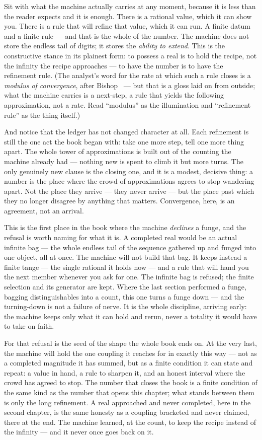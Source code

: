 Sit with what the machine actually carries at any moment, because it is less than the reader expects and it is
enough. There is a rational value, which it can show you. There is a rule that will refine that value, which it can
run. A finite datum and a finite rule --- and that is the whole of the number. The machine does not store the endless
tail of digits; it stores the \emph{ability to extend}. This is the constructive stance in its plainest form: to
possess a real is to hold the recipe, not the infinity the recipe approaches --- to have the number is to have the
refinement rule. (The analyst's word for the rate at which such a rule closes is a \emph{modulus of convergence},
after Bishop~\cite{bishop2006} --- but that is a gloss laid on from outside; what the machine carries is a next-step, a
rule that yields the following approximation, not a rate. Read ``modulus'' as the illumination and ``refinement rule''
as the thing itself.)

And notice that the ledger has not changed character at all. Each refinement is still the one act the book began with:
take one more step, tell one more thing apart. The whole tower of approximations is built out of the counting the
machine already had --- nothing new is spent to climb it but more turns. The only genuinely new clause is the closing
one, and it is a modest, decisive thing: a number is the place where the crowd of approximations agrees to stop
wandering apart. Not the place they arrive --- they never arrive --- but the place past which they no longer disagree
by anything that matters. Convergence, here, is an agreement, not an arrival.

This is the first place in the book where the machine \emph{declines} a funge, and the refusal is worth naming for
what it is. A completed real would be an actual infinite bag --- the whole endless tail of the sequence gathered up
and funged into one object, all at once. The machine will not build that bag. It keeps instead a finite tange --- the
single rational it holds now --- and a rule that will hand you the next member whenever you ask for one. The infinite
bag is refused; the finite selection and its generator are kept. Where the last section performed a funge, bagging
distinguishables into a count, this one turns a funge down --- and the turning-down is not a failure of nerve. It is
the whole discipline, arriving early: the machine keeps only what it can hold and rerun, never a totality it would
have to take on faith.

For that refusal is the seed of the shape the whole book ends on. At the very last, the machine will hold the one
coupling it reaches for in exactly this way --- not as a completed magnitude it has summed, but as a finite condition
it can state and repeat: a value in hand, a rule to sharpen it, and an honest interval where the crowd has agreed to
stop. The number that closes the book is a finite condition of the same kind as the number that opens this chapter;
what stands between them is only the long refinement. A real approached and never completed, here in the second
chapter, is the same honesty as a coupling bracketed and never claimed, there at the end. The machine learned, at the
count, to keep the recipe instead of the infinity --- and it never once goes back on it.


